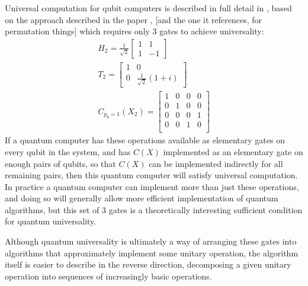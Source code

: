 Universal computation for qubit computers is described in full detail in \cite{textbook}, based on the approach described in the paper \cite{universal-qubit}, [and the one it references, for permutation things] which requires only 3 gates to achieve universality:
\begin{align*}
H_2 = \frac{1}{\sqrt{2}}\left[\begin{matrix}
1 & 1 \\
1 & -1
\end{matrix}\right]
\\
T_2 = \left[\begin{matrix}
	1 & 0 \\
	0 & \frac{1}{\sqrt{2}}\left(1+ i\right)
\end{matrix}\right]
\\
C_{p_0=1}(X_2) = \left[\begin{matrix}
1 & 0 & 0 & 0 \\
0 & 1 & 0 & 0 \\
0 & 0 & 0 & 1 \\
0 & 0 & 1 & 0 \\
\end{matrix}\right]
\end{align*}
If a quantum computer has these operations available as elementary gates on every qubit in the system, and has $C(X)$ implemented as an elementary gate on enough pairs of qubits, so that $C(X)$ can be implemented indirectly for all remaining pairs, then this quantum computer will satisfy universal computation. In practice a quantum computer can implement more than just these operations, and doing so will generally allow more efficient implementation of quantum algorithms, but this set of 3 gates is a theoretically interesting sufficient condition for quantum universality.

Although quantum universality is ultimately a way of arranging these gates into algorithms that approximately implement some unitary operation, the algorithm itself is easier to describe in the reverse direction, decomposing a given unitary operation into sequences of increasingly basic operations.

